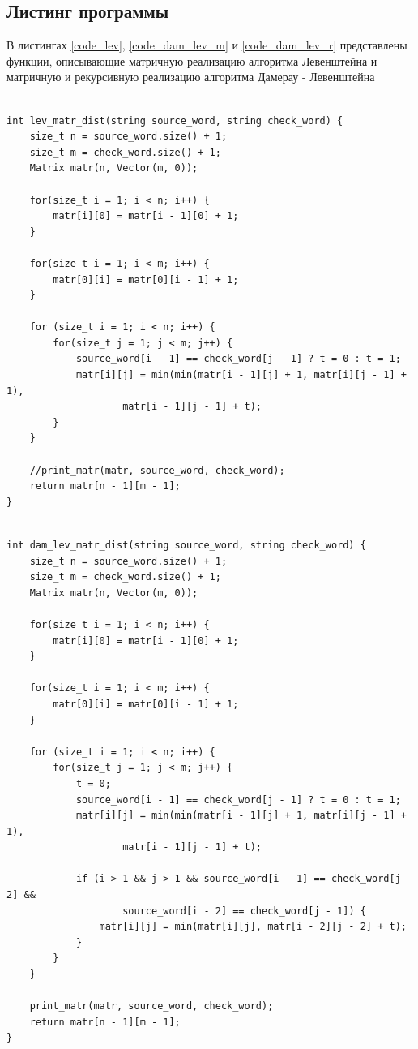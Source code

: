 \documentclass[a4paper,12pt]{article}
\begin{document}
    
    \subsection{Листинг программы}
	
	В листингах \ref{code_lev},  \ref{code_dam_lev_m} и \ref{code_dam_lev_r} представлены функции, описывающие матричную реализацию алгоритма Левенштейна и матричную и рекурсивную реализацию алгоритма Дамерау - Левенштейна
	\begin{center}
	\begin{lstlisting}[label=code_lev, caption={Матричный алгоритм Левенштейна}]

int lev_matr_dist(string source_word, string check_word) {
    size_t n = source_word.size() + 1;
    size_t m = check_word.size() + 1;
    Matrix matr(n, Vector(m, 0));

    for(size_t i = 1; i < n; i++) {
        matr[i][0] = matr[i - 1][0] + 1;
    }

    for(size_t i = 1; i < m; i++) {
        matr[0][i] = matr[0][i - 1] + 1;
    }

    for (size_t i = 1; i < n; i++) {
        for(size_t j = 1; j < m; j++) {
            source_word[i - 1] == check_word[j - 1] ? t = 0 : t = 1;
            matr[i][j] = min(min(matr[i - 1][j] + 1, matr[i][j - 1] + 1),
                    matr[i - 1][j - 1] + t);
        }
    }

    //print_matr(matr, source_word, check_word);
    return matr[n - 1][m - 1];
}
	\end{lstlisting}  
	\end{center}
    
\begin{lstlisting}[label=code_dam_lev_m, caption={Матричный алгоритм Дамерау - Левенштейна}]     

int dam_lev_matr_dist(string source_word, string check_word) {
    size_t n = source_word.size() + 1;
    size_t m = check_word.size() + 1;
    Matrix matr(n, Vector(m, 0));

    for(size_t i = 1; i < n; i++) {
        matr[i][0] = matr[i - 1][0] + 1;
    }

    for(size_t i = 1; i < m; i++) {
        matr[0][i] = matr[0][i - 1] + 1;
    }

    for (size_t i = 1; i < n; i++) {
        for(size_t j = 1; j < m; j++) {
            t = 0;
            source_word[i - 1] == check_word[j - 1] ? t = 0 : t = 1;
            matr[i][j] = min(min(matr[i - 1][j] + 1, matr[i][j - 1] + 1),
                    matr[i - 1][j - 1] + t);

            if (i > 1 && j > 1 && source_word[i - 1] == check_word[j - 2] &&
                    source_word[i - 2] == check_word[j - 1]) {
                matr[i][j] = min(matr[i][j], matr[i - 2][j - 2] + t);
            }
        }
    }

    print_matr(matr, source_word, check_word);
    return matr[n - 1][m - 1];
}
\end{lstlisting}
\end{document}
